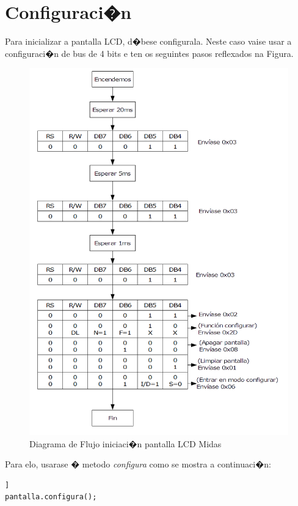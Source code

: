 \documentclass[11pt,twoside]{book}
\begin{document}
\section{Configuraci�n}

Para inicializar a pantalla LCD, d�bese configurala. Neste caso vaise usar a configuraci�n de bus de 4 bits e ten os seguintes pasos reflexados na Figura.

\begin{figure}[H]
	\begin{center}
		\includegraphics[scale=0.6]{images/inicializar_lcd.png}
	\end{center}
	\caption{Diagrama de Flujo iniciaci�n pantalla LCD Midas}
	\label{fig:DiagramaFlujoPantalla}
\end{figure}

Para elo, usarase � metodo \textit{configura} como se mostra a continuaci�n:
\begin{lstlisting}] 
pantalla.configura();
\end{lstlisting}
\end{document}

